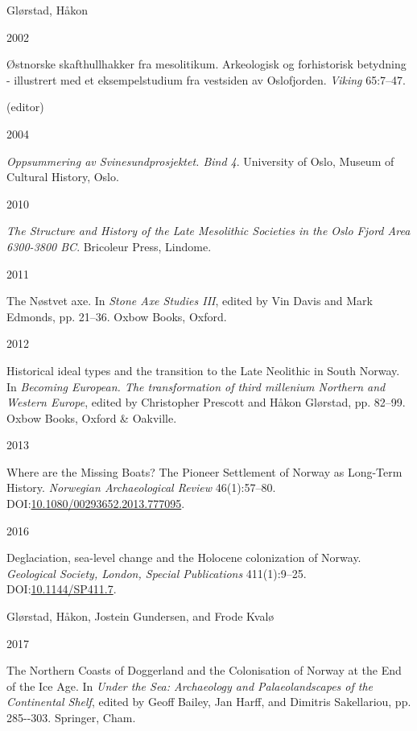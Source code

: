 \documentclass[
  12pt,
  a4paper,
  oneside]{book}
\newlength{\cslhangindent}
\newlength{\csllabelwidth}
\newlength{\cslentryspacingunit} %
\newenvironment{CSLReferences}[2] %
 {%
  \setlength{\parindent}{0pt}
  \ifodd #1
  \let\oldpar\par
  \def\par{\hangindent=\cslhangindent\oldpar}
  \fi
  \setlength{\parskip}{#2\cslentryspacingunit}
 }%
 {}
\newcommand{\CSLBlock}[1]{#1\hfill\break}
\newcommand{\CSLLeftMargin}[1]{\parbox[t]{\csllabelwidth}{#1}}
\newcommand{\CSLRightInline}[1]{\parbox[t]{\linewidth - \csllabelwidth}{#1}\break}
\begin{document}
\begin{CSLReferences}{0}{0}
\leavevmode{}%
\CSLBlock{Glørstad, Håkon}
\CSLLeftMargin{ 2002}
\CSLRightInline{Østnorske skafthullhakker fra mesolitikum. Arkeologisk og forhistorisk betydning - illustrert med et eksempelstudium fra vestsiden av Oslofjorden. \emph{Viking} 65:7--47.}

\leavevmode{}%
\CSLBlock{ (editor)}
\CSLLeftMargin{ 2004}
\CSLRightInline{\emph{{Oppsummering av Svinesundprosjektet. Bind 4}}. University of Oslo, Museum of Cultural History, Oslo.}

\leavevmode{}%
\CSLLeftMargin{ 2010 }
\CSLRightInline{\emph{{The Structure and History of the Late Mesolithic Societies in the Oslo Fjord Area 6300-3800 BC}}. Bricoleur Press, Lindome.}

\leavevmode{}%
\CSLLeftMargin{ 2011 }
\CSLRightInline{{The Nøstvet axe}. In \emph{{Stone Axe Studies III}}, edited by Vin Davis and Mark Edmonds, pp. 21--36. Oxbow Books, Oxford.}

\leavevmode{}%
\CSLLeftMargin{ 2012 }
\CSLRightInline{{Historical ideal types and the transition to the Late Neolithic in South Norway}. In \emph{{Becoming European. The transformation of third millenium Northern and Western Europe}}, edited by Christopher Prescott and Håkon Glørstad, pp. 82--99. Oxbow Books, Oxford \& Oakville.}

\leavevmode{}%
\CSLLeftMargin{ 2013 }
\CSLRightInline{{Where are the Missing Boats? The Pioneer Settlement of Norway as Long-Term History}. \emph{Norwegian Archaeological Review} 46(1):57--80. DOI:\href{https://doi.org/10.1080/00293652.2013.777095}{10.1080/00293652.2013.777095}.}

\leavevmode{}%
\CSLLeftMargin{ 2016 }
\CSLRightInline{Deglaciation, sea-level change and the Holocene colonization of Norway. \emph{Geological Society, London, Special Publications} 411(1):9--25. DOI:\href{https://doi.org/10.1144/SP411.7}{10.1144/SP411.7}.}

\leavevmode{}%
\CSLBlock{Glørstad, Håkon, Jostein Gundersen, and Frode Kvalø}
\CSLLeftMargin{ 2017}
\CSLRightInline{{The Northern Coasts of Doggerland and the Colonisation of Norway at the End of the Ice Age}. In \emph{{Under the Sea: Archaeology and Palaeolandscapes of the Continental Shelf}}, edited by Geoff Bailey, Jan Harff, and Dimitris Sakellariou, pp. 285-\/-303. Springer, Cham.}


\end{CSLReferences}
\end{document}
